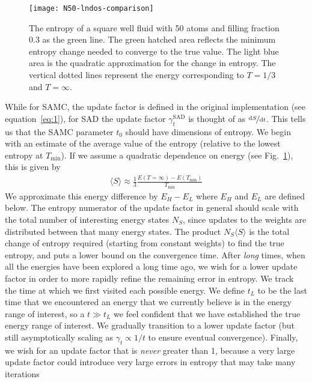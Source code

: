 \documentclass[letterpaper,twocolumn,amsmath,amssymb,pre,aps,10pt]{revtex4-1}
\begin{document}
\begin{figure}
  \texttt{[image: N50-lndos-comparison]}
  \caption{The entropy of a square well fluid with 50 atoms and filling fraction
        0.3 as the green line.  The green hatched area reflects the
        minimum entropy change needed to converge to the true value.
        The light blue area is the quadratic approximation
        for the change in entropy.  The vertical dotted lines represent
        the energy corresponding to $T=1/3$ and $T=\infty$.}
  \label{fig:entropy-cartoon}
\end{figure}

While for SAMC, the update factor is defined in the original
implementation (see equation~\eqref{eq:1}), for SAD the update factor $\gamma_{t}^{\text{SAD}}$ is
thought of as $\nicefrac{\text{d}S}{\text{d}t}$. This tells us that
the SAMC parameter
$t_0$ should have dimensions of entropy.
We begin with an estimate of the average value of the entropy (relative
to the lowest entropy at $T_{\min}$).  If we assume a quadratic
dependence on energy (see Fig.~\ref{fig:entropy-cartoon}), this is given by
\begin{align}
\langle S\rangle \approx \frac13 \frac{E({T=\infty}) - E(T_{\min})}{T_{\min}}
\end{align}
We approximate this energy difference by $E_H -E_L$ where $E_H$ and
$E_L$ are defined below. The entropy numerator of the update factor in
general should scale with the total number of interesting energy states
$N_S$, since updates to the weights are distributed between that many
energy states.  The product $N_S\langle S\rangle$ is the total change
of entropy required (starting from constant weights) to find the true
entropy, and puts a lower bound on the convergence time. After
\emph{long} times, when all the energies have been explored a long time ago, we
wish for a lower update factor in order to more rapidly refine the
remaining error in entropy.  We track the time at which we first visited
each possible energy.  We define $t_L$ to be the last time that we
encountered an energy that we currently believe is in the energy range
of interest, so a $t\gg t_L$ we feel confident that we have established
the true energy range of interest. We gradually transition to a lower
update factor (but still asymptotically scaling as $\gamma_t \propto
1/t$ to ensure eventual convergence).  Finally, we wish for an update
factor that is \emph{never} greater than 1, because a very large update
factor could introduce very large errors in entropy that may take many iterations
\end{document}
